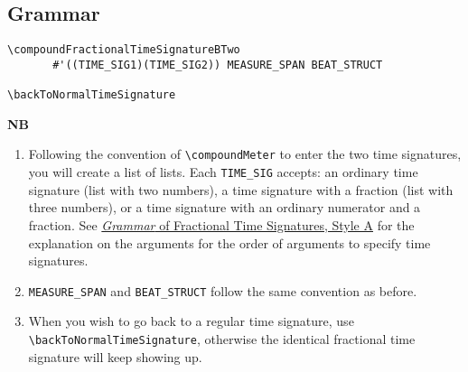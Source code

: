 \subsection{Grammar}
\begin{verbatim}
\compoundFractionalTimeSignatureBTwo 
       #'((TIME_SIG1)(TIME_SIG2)) MEASURE_SPAN BEAT_STRUCT

\backToNormalTimeSignature

\end{verbatim}
\textbf{NB} 
\begin{enumerate}
\item Following the convention of \verb|\compoundMeter| to enter the two time signatures, you will create a list of lists. Each \verb|TIME_SIG| accepts: an ordinary time signature (list with two numbers), a time signature with a fraction (list with three numbers), or a time signature with an ordinary numerator and a fraction. See \hyperref[sec:time_signatures_styleA_convention]{\textit{Grammar} of Fractional Time Signatures, Style A} for the explanation on the arguments for the order of arguments to specify time signatures.
\item \verb|MEASURE_SPAN| and \verb|BEAT_STRUCT| follow the same convention as before.
\item When you wish to go back to a regular time signature, use \verb|\backToNormalTimeSignature|, otherwise the identical fractional time signature will keep showing up.
\end{enumerate}
